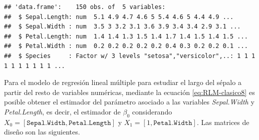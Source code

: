 \documentclass[
  11pt,
]{book}
\newenvironment{Shaded}{\begin{snugshade}}{\end{snugshade}}
\newcommand{\AttributeTok}[1]{\textcolor[rgb]{0.13,0.29,0.53}{#1}}
\newcommand{\CommentTok}[1]{\textcolor[rgb]{0.56,0.35,0.01}{\textit{#1}}}
\newcommand{\DecValTok}[1]{\textcolor[rgb]{0.00,0.00,0.81}{#1}}
\newcommand{\FunctionTok}[1]{\textcolor[rgb]{0.13,0.29,0.53}{\textbf{#1}}}
\newcommand{\NormalTok}[1]{#1}
\newcommand{\OtherTok}[1]{\textcolor[rgb]{0.56,0.35,0.01}{#1}}
\newcommand{\SpecialCharTok}[1]{\textcolor[rgb]{0.81,0.36,0.00}{\textbf{#1}}}
\theoremstyle{definition}
\theoremstyle{definition}
\theoremstyle{definition}
\theoremstyle{definition}
\theoremstyle{remark}
\begin{document}
\begin{verbatim}
## 'data.frame':    150 obs. of  5 variables:
##  $ Sepal.Length: num  5.1 4.9 4.7 4.6 5 5.4 4.6 5 4.4 4.9 ...
##  $ Sepal.Width : num  3.5 3 3.2 3.1 3.6 3.9 3.4 3.4 2.9 3.1 ...
##  $ Petal.Length: num  1.4 1.4 1.3 1.5 1.4 1.7 1.4 1.5 1.4 1.5 ...
##  $ Petal.Width : num  0.2 0.2 0.2 0.2 0.2 0.4 0.3 0.2 0.2 0.1 ...
##  $ Species     : Factor w/ 3 levels "setosa","versicolor",..: 1 1 1 1 1 1 1 1 1 1 ...
\end{verbatim}

Para el modelo de regresión lineal múltiple para estudiar el largo del sépalo a partir del resto de variables numéricas, mediante la ecuación \eqref{eq:RLM-clasico8} es posible obtener el estimador del parámetro asociado a las variables \emph{Sepal.Width} y \emph{Petal.Length}, es decir, el estimador de \(\beta_0\) considerando \(X_0 = [\texttt{Sepal.Width}, \texttt{Petal.Length}]\) y \(X_1 = [1, \texttt{Petal.Width}]\). Las matrices de diseño son las siguientes.

\begin{Shaded}
\end{Shaded}
\end{document}

